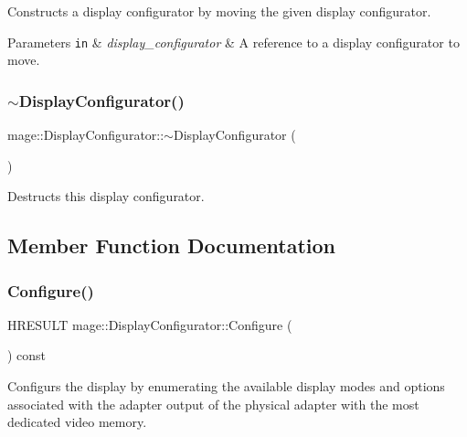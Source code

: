 Constructs a display configurator by moving the given display configurator.


\begin{DoxyParams}[1]{Parameters}
\mbox{\tt in}  & {\em display\+\_\+configurator} & A reference to a display configurator to move. \\
\hline
\end{DoxyParams}
\hypertarget{classmage_1_1_display_configurator_af6546383269503e3cab077e4bf54556e}{}\label{classmage_1_1_display_configurator_af6546383269503e3cab077e4bf54556e} 
\subsubsection{\texorpdfstring{$\sim$\+Display\+Configurator()}{~DisplayConfigurator()}}
{\footnotesize\ttfamily mage\+::\+Display\+Configurator\+::$\sim$\+Display\+Configurator (\begin{DoxyParamCaption}{ }\end{DoxyParamCaption})\hspace{0.3cm}{\ttfamily [default]}}

Destructs this display configurator. 

\subsection{Member Function Documentation}
\hypertarget{classmage_1_1_display_configurator_aa84373fba5d7806f065f7633a03f7d64}{}\label{classmage_1_1_display_configurator_aa84373fba5d7806f065f7633a03f7d64} 
\subsubsection{\texorpdfstring{Configure()}{Configure()}}
{\footnotesize\ttfamily H\+R\+E\+S\+U\+LT mage\+::\+Display\+Configurator\+::\+Configure (\begin{DoxyParamCaption}{ }\end{DoxyParamCaption}) const}

Configurs the display by enumerating the available display modes and options associated with the adapter output of the physical adapter with the most dedicated video memory.

